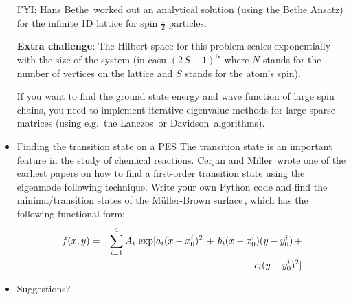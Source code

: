 \documentclass[11pt]{article}
\begin{document}
\begin{itemize}
FYI: Hans Bethe\,\cite{BETHE:1931a} worked out an analytical solution (using the Bethe Ansatz)
for the infinite 1D lattice for spin $\frac{1}{2}$ particles.

\textbf{Extra challenge}:\newline
The Hilbert space for this problem scales exponentially with the size of the system (in casu $(2\,S+1)^N$ where $N$ 
stands for the number of vertices on the lattice and $S$ stands for the atom's spin). 

If you want to find the ground state energy and wave function of large spin chains, 
you need to implement iterative eigenvalue methods for large sparse matrices (using 
e.g.~the Lanczos\,\cite{CULLUM:2002a} or Davidson\,\cite{DAVIDSON:1975a} algorithms).

\item Finding the transition state on a PES\newline
The transition state is an important feature in the study of chemical reactions. 
Cerjan and Miller\,\cite{CERJAN:1979a} wrote one of the earliest papers on how to find a first-order transition state 
using the eigenmode following technique.
Write your own Python code and find the minima/transition states of the M\"uller-Brown surface\,\cite{MUELLER:1979a}, which 
has the following functional form:
\begin{eqnarray}
   f(x,y) & = & \sum_{i=1}^{4} A_i\, \exp \Large[ a_i (x-x_0^i)^2 \,+\, b_i (x-x_0^i)(y-y_0^i)\, + \\
          &   &                                   c_i (y-y_0^i)^2 \Large ]                                   
\end{eqnarray}
\item Suggestions?

\end{itemize}



\end{document}
